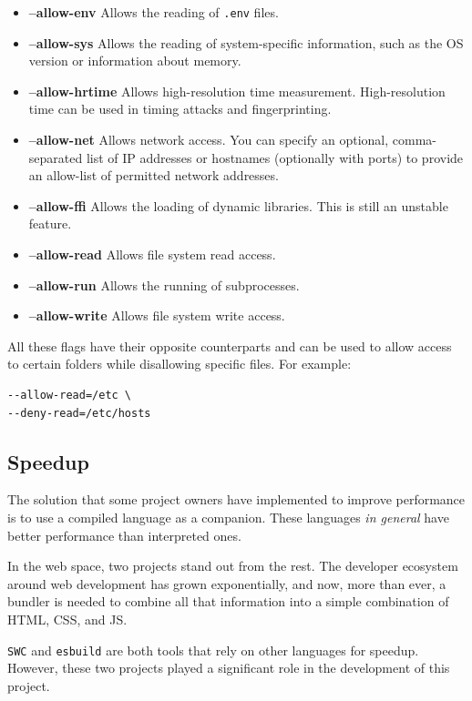 \documentclass[10pt,journal,compsoc]{IEEEtran}
\begin{document}
\begin{itemize}
    \item \textbf{--allow-env} Allows the reading of \verb|.env| files.
    \item \textbf{--allow-sys} Allows the reading of system-specific information, such as the OS version or information about memory.
    \item \textbf{--allow-hrtime} Allows high-resolution time measurement. High-resolution time can be used in timing attacks and fingerprinting.
    \item \textbf{--allow-net} Allows network access. You can specify an optional, comma-separated list of IP addresses or hostnames (optionally with ports) to provide an allow-list of permitted network addresses.
    \item \textbf{--allow-ffi} Allows the loading of dynamic libraries. This is still an unstable feature.
    \item \textbf{--allow-read} Allows file system read access.
    \item \textbf{--allow-run} Allows the running of subprocesses.
    \item \textbf{--allow-write} Allows file system write access.
\end{itemize}

All these flags have their opposite counterparts and can be used to allow access to certain folders while disallowing specific files. For example:

\begin{lstlisting}
--allow-read=/etc \
--deny-read=/etc/hosts
    \end{lstlisting}

\subsection{Speedup}

The solution that some project owners have implemented to improve performance is to use a compiled language as a companion. These languages \textit{in general} have better performance than interpreted ones.

In the web space, two projects stand out from the rest. The developer ecosystem around web development has grown exponentially, and now, more than ever, a bundler \cite{Bundler} is needed to combine all that information into a simple combination of HTML, CSS, and JS.

\verb|SWC| and \verb|esbuild| are both tools that rely on other languages for speedup. However, these two projects played a significant role in the development of this project.
\end{document}
